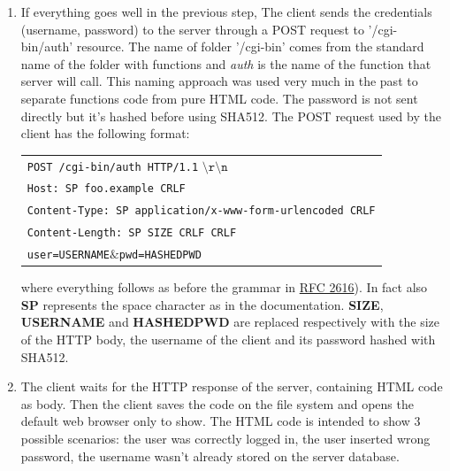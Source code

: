 \begin{enumerate}
\item{If everything goes well in the previous step, The client sends the credentials (username, password) to the server through a POST request to '/cgi-bin/auth' resource. The name of folder '/cgi-bin' comes from the standard name of the folder with functions and \textit{auth} is the name of the function that server will call. This naming approach was used very much in the past to separate functions code from pure HTML code. The password is not sent directly but it's hashed before using SHA512. The POST request used by the client has the following format:\\
\begin{table}[H]
\hspace{2cm}\centering\footnotesize
\begin{tabular}{|l|}
\hline
\texttt{POST /cgi-bin/auth HTTP/1.1} $\mathtt{\setminus r\setminus n}$\\
\texttt{Host: SP foo.example CRLF}\\
\texttt{Content-Type: SP application/x-www-form-urlencoded CRLF}\\
\texttt{Content-Length: SP SIZE CRLF CRLF}\\
\texttt{user=USERNAME$\&$pwd=HASHEDPWD}\\
\hline
\end{tabular}
\end{table}
where everything follows as before the grammar in \href{https://tools.ietf.org/html/rfc2616}{RFC 2616}). In fact also \textbf{SP} represents the space character as in the documentation. \textbf{SIZE}, \textbf{USERNAME} and \textbf{HASHEDPWD} are replaced respectively with the size of the HTTP body, the username of the client and its password hashed with SHA512.
}
\item{The client waits for the HTTP response of the server, containing HTML code as body. Then the client saves the code on the file system and opens the default web browser only to show. The HTML code is intended to show 3 possible scenarios: the user was correctly logged in, the user inserted wrong password, the username wasn't already stored on the server database.}
\end{enumerate}

